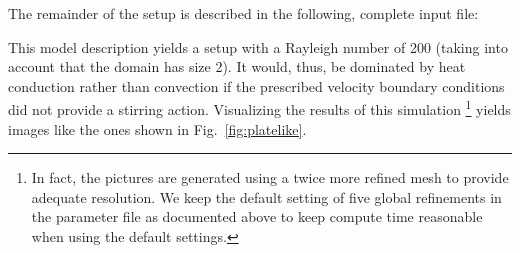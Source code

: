 \documentclass{article}
\begin{document}
The remainder of the setup is described in the following, complete input file:



This model description yields a setup with a Rayleigh number of 200 (taking
into account that the domain has size 2). It would, thus, be dominated by heat
conduction rather than convection if the prescribed velocity boundary conditions
did not provide a stirring action. Visualizing the results of this simulation%
\footnote{In fact, the pictures are generated using a twice more refined mesh
to provide adequate resolution. We keep the default setting of five
global refinements in the parameter file as documented above to keep compute
time reasonable when using the default settings.}
yields images like the ones shown in Fig.~\ref{fig:platelike}.
\end{document}
